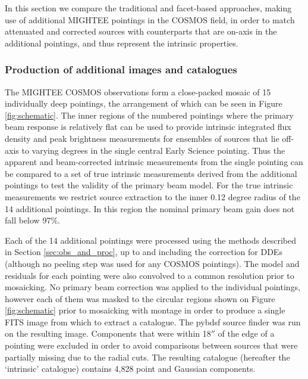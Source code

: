 \documentclass[usenatbib,usedcolumn]{mnras}
\begin{document}
In this section we compare the traditional and facet-based approaches, making use of additional MIGHTEE pointings in the COSMOS field, in order to match attenuated and corrected sources with counterparts that are on-axis in the additional pointings, and thus represent the intrinsic properties. 

\subsubsection{Production of additional images and catalogues}
\label{sec:additional_proc}

The MIGHTEE COSMOS observations form a close-packed mosaic of 15 individually deep pointings, the arrangement of which can be seen in Figure \ref{fig:schematic}. The inner regions of the numbered pointings where the primary beam response is relatively flat can be used to provide intrinsic integrated flux density and peak brightness measurements for ensembles of sources that lie off-axis to varying degrees in the single central Early Science pointing. Thus the apparent and beam-corrected intrinsic measurements from the single pointing can be compared to a set of true intrinsic measurements derived from the additional pointings to test the validity of the primary beam model. For the true intrinsic measurements we restrict source extraction to the inner 0.12 degree radius of the 14 additional pointings. In this region the nominal primary beam gain does not fall below 97\%. 

Each of the 14 additional pointings were processed using the methods described in Section \ref{sec:obs_and_proc}, up to and including the correction for DDEs (although no peeling step was used for any COSMOS pointings). The model and residuals for each pointing were also convolved to a common resolution prior to mosaicking. No primary beam correction was applied to the individual pointings, however each of them was masked to the circular regions shown on Figure \ref{fig:schematic} prior to mosaicking with {\sc montage} in order to produce a single FITS image from which to extract a catalogue. The {\sc pybdsf} source finder was run on the resulting image. Components that were within 18$''$ of the edge of a pointing were excluded in order to avoid comparisons between sources that were partially missing due to the radial cuts. The resulting catalogue (hereafter the `intrinsic' catalogue) contains 4,828 point and Gaussian components.
\end{document}
